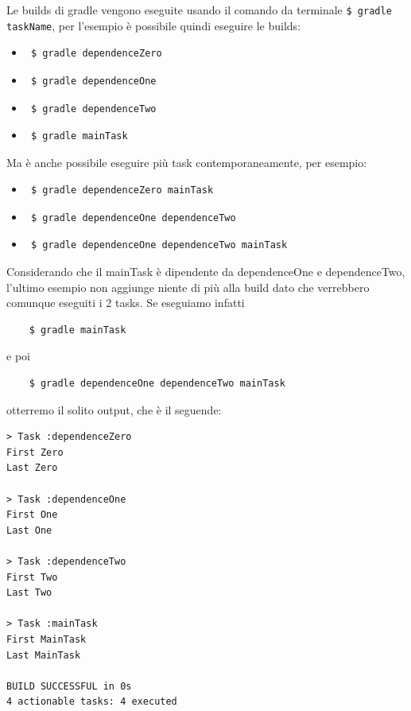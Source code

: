 Le builds di gradle vengono eseguite usando il comando da terminale \texttt{\$ gradle taskName}, per l'esempio è possibile quindi eseguire le builds:
\begin{itemize}
    \item \begin{verbatim} $ gradle dependenceZero \end{verbatim}
    \item \begin{verbatim} $ gradle dependenceOne \end{verbatim}
    \item \begin{verbatim} $ gradle dependenceTwo \end{verbatim}
    \item \begin{verbatim} $ gradle mainTask \end{verbatim}
\end{itemize}
Ma è anche possibile eseguire più task contemporaneamente, per esempio:
\begin{itemize}
    \item \begin{verbatim} $ gradle dependenceZero mainTask\end{verbatim}
    \item \begin{verbatim} $ gradle dependenceOne dependenceTwo \end{verbatim}
    \item \begin{verbatim} $ gradle dependenceOne dependenceTwo mainTask\end{verbatim}
\end{itemize}
Considerando che il mainTask è dipendente da dependenceOne e dependenceTwo, l'ultimo esempio non aggiunge niente di più alla build dato che verrebbero comunque eseguiti i 2 tasks. Se eseguiamo infatti
\begin{verbatim}
    $ gradle mainTask \end{verbatim} 
e poi 
\begin{verbatim}
    $ gradle dependenceOne dependenceTwo mainTask \end{verbatim}
otterremo il solito output, che è il seguende:
\label{outMainTask}
\begin{verbatim}
> Task :dependenceZero 
First Zero
Last Zero

> Task :dependenceOne 
First One
Last One

> Task :dependenceTwo 
First Two
Last Two

> Task :mainTask 
First MainTask
Last MainTask

BUILD SUCCESSFUL in 0s
4 actionable tasks: 4 executed\end{verbatim} 
